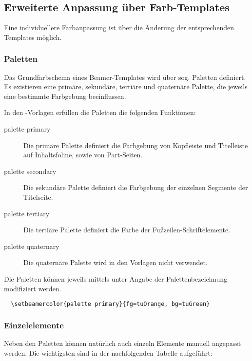 \clearpage
\subsection{Erweiterte Anpassung über Farb-Templates}

Eine individuellere Farbanpassung ist über die Änderung der entsprechenden
Templates möglich.

\subsubsection{Paletten}

Das Grundfarbschema eines Beamer-Templates wird über sog. Paletten definiert.
Es existieren eine primäre, sekundäre, tertiäre und quaternäre Palette,
die jeweils eine bestimmte Farbgebung beeinflussen.

In den \tubslatex-Vorlagen erfüllen die Paletten die folgenden Funktionen:

\begin{description}
  \item[\ttfamily palette primary]
    Die primäre Palette definiert die Farbgebung
    von Kopfleiste und Titelleiste auf Inhaltsfoline,
    sowie von Part-Seiten.
  \item[\ttfamily palette secondary]
    Die sekundäre Palette definiert die Farbgebung der einzelnen
    Segmente der Titelseite.
  \item[\ttfamily palette tertiary]
    Die tertiäre Palette definiert die Farbe der Fußzeilen-Schriftelemente.
  \item[\ttfamily palette quaternary]
    Die quaternäre Palette wird in den Vorlagen nicht verwendet.
\end{description}

Die Paletten können jeweils mittels 
unter Angabe der Palettenbezeichnung modifiziert werden.

\begin{example}
\begin{lstlisting}
  \setbeamercolor{palette primary}{fg=tuOrange, bg=tuGreen}
\end{lstlisting}
\end{example}

\subsubsection{Einzelelemente}

Neben den Paletten können natürlich auch einzeln Elemente manuell angepasst
werden. Die wichtigsten sind in der nachfolgenden Tabelle aufgeführt:


